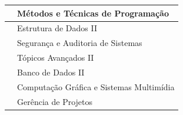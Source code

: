 \documentclass[11pt,fleqn]{book} %
\begin{document}
\begin{table}[]
{\begin{tabular}{@{}l|l@{}}
			\nameref{5_lab}                 & Métodos e Técnicas de Programação                                         \\ \midrule	
			\nameref{6_ia}                  & Estrutura de Dados II                                                     \\
			\nameref{6_seginfo}             & Segurança e Auditoria de Sistemas                                         \\
			\nameref{6_empdig}              & Tópicos Avançados II                                                      \\
			\nameref{6_datascience}         & Banco de Dados II                                                         \\
			\nameref{6_visstory}            & Computação Gráfica e Sistemas Multimídia                                  \\
			\nameref{6_opt}                 & Gerência de Projetos                                                       \\ \bottomrule
		\end{tabular}%
	}
\end{table}
\end{document}
